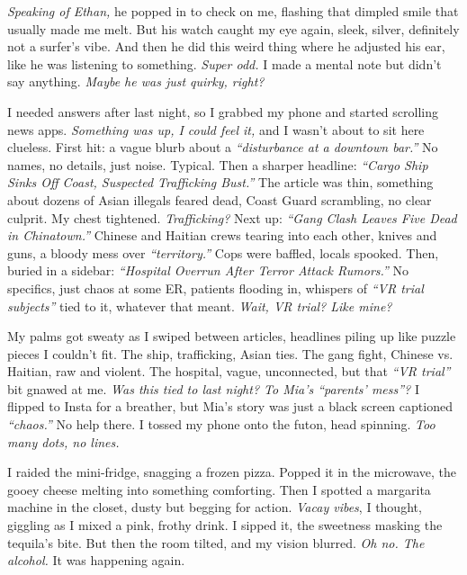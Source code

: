 \documentclass[12pt,oneside]{book} %
\begin{document}
\textit{Speaking of Ethan,} he popped in to check on me, flashing that dimpled smile that usually made me melt. But his watch caught my eye again, sleek, silver, definitely not a surfer’s vibe. And then he did this weird thing where he adjusted his ear, like he was listening to something. \textit{Super odd.} I made a mental note but didn’t say anything. \textit{Maybe he was just quirky, right?}

I needed answers after last night, so I grabbed my phone and started scrolling news apps. \textit{Something was up, I could feel it,} and I wasn’t about to sit here clueless. First hit: a vague blurb about a \textit{“disturbance at a downtown bar.”} No names, no details, just noise. Typical. Then a sharper headline: \textit{“Cargo Ship Sinks Off Coast, Suspected Trafficking Bust.”} The article was thin, something about dozens of Asian illegals feared dead, Coast Guard scrambling, no clear culprit. My chest tightened. \textit{Trafficking?} Next up: \textit{“Gang Clash Leaves Five Dead in Chinatown.”} Chinese and Haitian crews tearing into each other, knives and guns, a bloody mess over \textit{“territory.”} Cops were baffled, locals spooked. Then, buried in a sidebar: \textit{“Hospital Overrun After Terror Attack Rumors.”} No specifics, just chaos at some ER, patients flooding in, whispers of \textit{“VR trial subjects”} tied to it, whatever that meant. \textit{Wait, VR trial? Like mine?}

My palms got sweaty as I swiped between articles, headlines piling up like puzzle pieces I couldn’t fit. The ship, trafficking, Asian ties. The gang fight, Chinese vs. Haitian, raw and violent. The hospital, vague, unconnected, but that \textit{“VR trial”} bit gnawed at me. \textit{Was this tied to last night? To Mia’s “parents’ mess”?} I flipped to Insta for a breather, but Mia’s story was just a black screen captioned \textit{“chaos.”} No help there. I tossed my phone onto the futon, head spinning. \textit{Too many dots, no lines.}

I raided the mini-fridge, snagging a frozen pizza. Popped it in the microwave, the gooey cheese melting into something comforting. Then I spotted a margarita machine in the closet, dusty but begging for action. \textit{Vacay vibes}, I thought, giggling as I mixed a pink, frothy drink. I sipped it, the sweetness masking the tequila’s bite. But then the room tilted, and my vision blurred. \textit{Oh no. The alcohol.} It was happening again.
\end{document}
